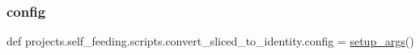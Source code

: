 \subsubsection{\texorpdfstring{config}{config}}
{\footnotesize\ttfamily def projects.\+self\+\_\+feeding.\+scripts.\+convert\+\_\+sliced\+\_\+to\+\_\+identity.\+config = \hyperlink{namespaceprojects_1_1self__feeding_1_1scripts_1_1convert__sliced__to__identity_aea494b2057e7cfdbd2ecd268327400c4}{setup\+\_\+args}()}

